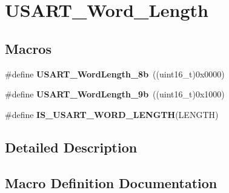 \hypertarget{group___u_s_a_r_t___word___length}{}\section{U\+S\+A\+R\+T\+\_\+\+Word\+\_\+\+Length}
\label{group___u_s_a_r_t___word___length}
\subsection*{Macros}
\begin{DoxyCompactItemize}
\item 
\hypertarget{group___u_s_a_r_t___word___length_ga08682faddc657df85a93627b5a146c25}{}\#define {\bfseries U\+S\+A\+R\+T\+\_\+\+Word\+Length\+\_\+8b}~((uint16\+\_\+t)0x0000)\label{group___u_s_a_r_t___word___length_ga08682faddc657df85a93627b5a146c25}

\item 
\hypertarget{group___u_s_a_r_t___word___length_gae7dd162142660e09e2321aa3f33dc4d2}{}\#define {\bfseries U\+S\+A\+R\+T\+\_\+\+Word\+Length\+\_\+9b}~((uint16\+\_\+t)0x1000)\label{group___u_s_a_r_t___word___length_gae7dd162142660e09e2321aa3f33dc4d2}

\item 
\#define {\bfseries I\+S\+\_\+\+U\+S\+A\+R\+T\+\_\+\+W\+O\+R\+D\+\_\+\+L\+E\+N\+G\+T\+H}(L\+E\+N\+G\+T\+H)
\end{DoxyCompactItemize}


\subsection{Detailed Description}


\subsection{Macro Definition Documentation}
\hypertarget{group___u_s_a_r_t___word___length_ga5b07b29ee91f0bea4c10ec0fd74fbc04}{}

